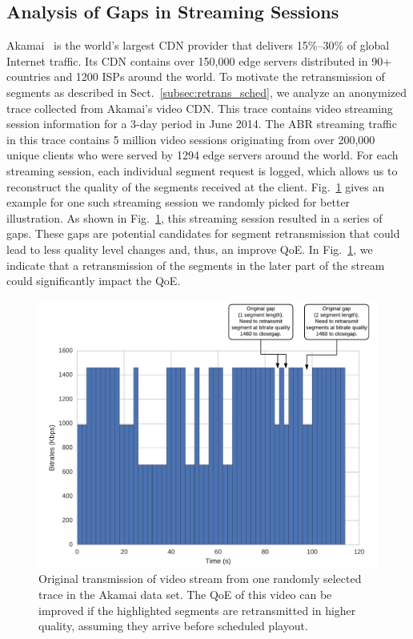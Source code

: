 \subsection{Analysis of Gaps in Streaming Sessions}
\label{subsec:ana_gap}
Akamai~\cite{AkamaiNetworkSIGOPS} is the world's largest CDN provider that delivers 15\%--30\% of global Internet traffic. Its CDN contains over 150,000 edge servers distributed in 90+ countries and 1200 ISPs around the world. To motivate the retransmission of segments as described in Sect.~\ref{subsec:retrans_sched}, we analyze an anonymized trace collected from Akamai's video CDN. This trace contains video streaming session information for a 3-day period in June 2014. The ABR streaming traffic in this trace contains 5 million video sessions originating from over 200,000 unique clients who were served by 1294 edge servers around the world. For each streaming session, each individual segment request is logged, which allows us to reconstruct the quality of the segments received at the client. Fig.~\ref{fig:gap_example} gives an example for one such streaming session we randomly picked for better illustration. As shown in Fig.~\ref{fig:gap_example}, this streaming session resulted in a  series of gaps. These gaps are potential candidates for segment retransmission that could lead to less quality level changes and, thus, an improve QoE. In Fig.~\ref{fig:gap_example}, we indicate that a retransmission of the segments in the later part of the stream could significantly impact the QoE.

\begin{figure}
\centering
\includegraphics[width=.9\linewidth] {figures/mobonerun.png}
\caption{Original transmission of video stream from one randomly selected trace in the Akamai data set. The QoE of this video can be improved if the highlighted segments are retransmitted in higher quality, assuming they arrive before scheduled playout.}
\label{fig:gap_example}
\vspace{-18pt}
\end{figure}

